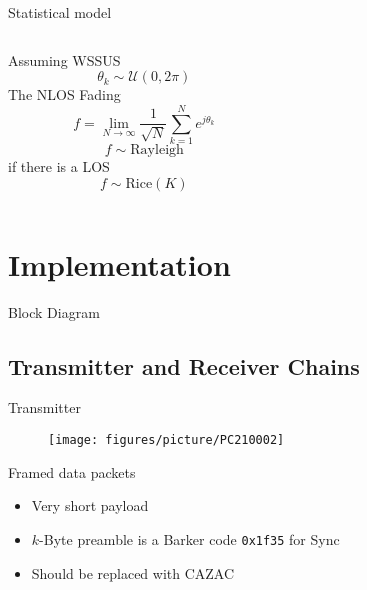 \documentclass[xetex, onlymath, handout]{beamer}
\begin{document}
\begin{frame}[fragile]{Statistical model}
  \begin{columns}
    \begin{column}{.4\linewidth}
      Assuming WSSUS
      \[
        \theta_k \sim \mathcal{U}(0, 2\pi)
      \]
      The NLOS Fading
      \[
        f = \lim_{N \to \infty} \frac{1}{\sqrt{N}} \sum_{k=1}^N e^{j\theta_k}
      \]
      \[
        f \sim \mathrm{ Rayleigh}
      \]
      if there is a LOS
      \[
        f \sim \mathrm{ Rice}(K)
      \]
    \end{column}
    \begin{column}{.6\linewidth}
      \begin{figure}
        \centering
        \resizebox{\linewidth}{!}{%
          
          }
      \end{figure}
    \end{column}
  \end{columns}
\end{frame}

\section{Implementation}


\begin{frame}{Block Diagram}
	\begin{figure}
		\centering
		\resizebox{.9\linewidth}{!}{
			
		}
		
	\end{figure}
\end{frame}

\subsection{Transmitter and Receiver Chains}

\begin{frame}{Transmitter}
  \begin{figure}
    \centering
    \texttt{[image: figures/picture/PC210002]}
  \end{figure}
\end{frame}

\begin{frame}{Framed data packets}
  \begin{figure}
    \centering
    \resizebox{\linewidth}{!}{
      
    }
  \end{figure}
  \begin{itemize}
    \item Very short payload
    \item \(k\)-Byte preamble is a Barker code \texttt{0x1f35} for Sync
    \item Should be replaced with CAZAC
  \end{itemize}
\end{frame}
\end{document}
